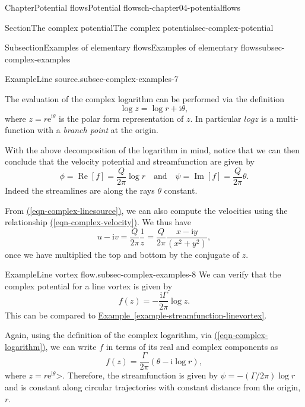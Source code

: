 \documentclass[oneside,10pt,]{book}
\newcommand{\xreffont}{\relax}
\numberwithin{equation}{section}
\renewcommand*{\Re}{\operatorname{Re}}
\renewcommand*{\Im}{\operatorname{Im}}
\newcommand{\e}{\mathrm{e}}
\newcommand{\im}{\mathrm{i}}
\begin{document}
\begin{chapterptx}{Chapter}{Potential flows}{}{Potential flows}{}{}{ch-chapter04-potentialflows}
\begin{sectionptx}{Section}{The complex potential}{}{The complex potential}{}{}{sec-complex-potential}
\begin{subsectionptx}{Subsection}{Examples of elementary flows}{}{Examples of elementary flows}{}{}{subsec-complex-examples}
\begin{example}{Example}{Line source.}{subsec-complex-examples-7}
\par
The evaluation of the complex logarithm can be performed via the definition%
\begin{equation}
\log z = \log r + \im \theta,\label{eqn-complex-logarithm}
\end{equation}
where \(z = r\e^{\im \theta}\) is the polar form representation of \(z\). In particular \(log z\) is a multi-function with a \emph{branch point} at the origin.%
\par
With the above decomposition of the logarithm in mind, notice that we can then conclude that the velocity potential and streamfunction are given by%
\begin{equation*}
\phi = \Re[f] = \frac{Q}{2\pi} \log r \quad \text{and} \quad
\psi = \Im[f] = \frac{Q}{2\pi} \theta.
\end{equation*}
Indeed the streamlines are along the rays \(\theta\) constant.%
\par
From \hyperref[eqn-complex-linesource]{({\xreffont\ref{eqn-complex-linesource}})}, we can also compute the velocities using the relationship \hyperref[eqn-complex-velocity]{({\xreffont\ref{eqn-complex-velocity}})}. We thus have%
\begin{equation*}
u - \im v = \frac{Q}{2\pi} \frac{1}{z} = \frac{Q}{2\pi} \frac{x - \im y}{(x^2 + y^2)},
\end{equation*}
once we have multiplied the top and bottom by the conjugate of \(z\).%
\end{example}
\begin{example}{Example}{Line vortex flow.}{subsec-complex-examples-8}%
%
We can verify that the complex potential for a line vortex is given by%
\begin{equation*}
f(z) = -\frac{\im \Gamma}{2\pi} \log z.
\end{equation*}
This can be compared to  \hyperref[example-streamfunction-linevortex]{Example~{\xreffont\ref{example-streamfunction-linevortex}}}.%
\par
Again, using the definition of the complex logarithm, via \hyperref[eqn-complex-logarithm]{({\xreffont\ref{eqn-complex-logarithm}})}, we can write \(f\) in terms of its real and complex components as%
\begin{equation*}
f(z) = \frac{\Gamma}{2\pi} (\theta - \im \log r),
\end{equation*}
where \(z = r\e^{\im\theta}\)\textgreater{}. Therefore, the streamfunction is given by \(\psi = -(\Gamma/2\pi) \log r\) and is constant along circular trajectories with constant distance from the origin, \(r\).%

\end{example}
\end{subsectionptx}
\end{sectionptx}
\end{chapterptx}
\end{document}
